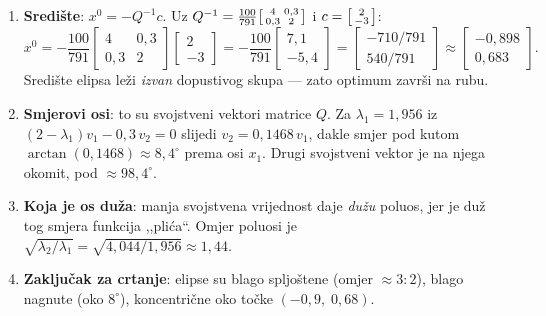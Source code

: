 \begin{korak}
\begin{enumerate}[leftmargin=*]
  \item \textbf{Središte}: $x^{0} = -Q^{-1}c$. Uz $Q^{-1} = \tfrac{100}{791}\begin{bsmallmatrix}4 & 0{,}3 \\ 0{,}3 & 2\end{bsmallmatrix}$
        i $c = \begin{bsmallmatrix}2 \\ -3\end{bsmallmatrix}$:
        \[
          x^{0} = -\frac{100}{791}\begin{bmatrix}4 & 0{,}3 \\ 0{,}3 & 2\end{bmatrix}
                   \begin{bmatrix}2 \\ -3\end{bmatrix}
                = -\frac{100}{791}\begin{bmatrix}7{,}1 \\ -5{,}4\end{bmatrix}
                = \begin{bmatrix}-710/791 \\ 540/791\end{bmatrix}
                \approx \begin{bmatrix}-0{,}898 \\ 0{,}683\end{bmatrix}.
        \]
        Središte elipsa leži \emph{izvan} dopustivog skupa --- zato optimum
        završi na rubu.
  \item \textbf{Smjerovi osi}: to su svojstveni vektori matrice $Q$. Za
        $\lambda_1 = 1{,}956$ iz $(2 - \lambda_1)v_1 - 0{,}3\,v_2 = 0$ slijedi
        $v_2 = 0{,}1468\,v_1$, dakle smjer pod kutom
        $\arctan(0{,}1468) \approx 8{,}4^\circ$ prema osi $x_1$. Drugi svojstveni
        vektor je na njega okomit, pod $\approx 98{,}4^\circ$.
  \item \textbf{Koja je os duža}: manja svojstvena vrijednost daje \emph{dužu}
        poluos, jer je duž tog smjera funkcija ,,plića``. Omjer poluosi je
        $\sqrt{\lambda_2/\lambda_1} = \sqrt{4{,}044/1{,}956} \approx 1{,}44$.
  \item \textbf{Zaključak za crtanje}: elipse su blago spljoštene (omjer $\approx 3{:}2$),
        blago nagnute (oko $8^\circ$), koncentrične oko točke $(-0{,}9,\; 0{,}68)$.
\end{enumerate}
\end{korak}


